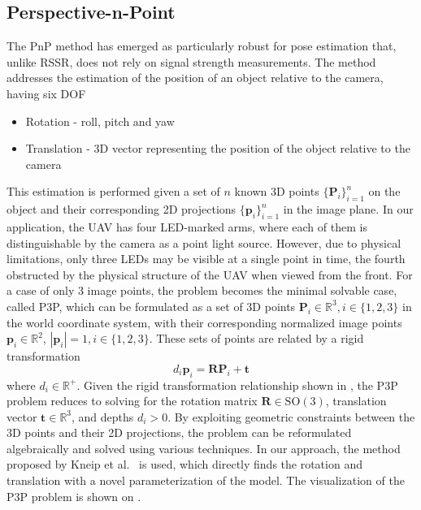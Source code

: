 \subsection{Perspective-n-Point}
The \ac{PnP} method has emerged as particularly robust for pose estimation that, unlike \ac{RSSR}, does not rely on signal strength measurements. The method addresses the estimation of the position of an object relative to the camera, having six \ac{DOF}
\begin{itemize}
\item{Rotation - roll, pitch and yaw}
\item{Translation - 3D vector representing the position of the object relative to the camera}
\end{itemize}
This estimation is performed given a set of $n$ known 3D points $\{\mathbf{P}_i\}_{i=1}^n$ on the object and their corresponding 2D projections $\{\mathbf{p}_i\}_{i=1}^n$ in the image plane.
In our application, the UAV has four \ac{LED}-marked arms, where each of them is distinguishable by the camera as a point light source.
However, due to physical limitations, only three \ac{LED}s may be visible at a single point in time, the fourth obstructed by the physical structure of the \ac{UAV} when viewed from the front.
For a case of only 3 image points, the problem becomes the minimal solvable case, called \ac{P3P}, which 
can be formulated as a set of 3D points $\textbf{P}_i \in \mathbb{R}^{3}, i \in \{1, 2, 3\}$ in the world coordinate system, with their corresponding normalized image points
$\textbf{p}_i \in \mathbb{R}^{2}$, $|\textbf{p}_i|=1, i \in \{1, 2, 3\}$. These sets of points are related by a rigid transformation~\cite{Ding_2023_CVPR}
\begin{equation}
d_i \textbf{p}_i = \textbf{R} \textbf{P}_i + \textbf{t}
\label{eq:p3p}
\end{equation}
where $d_i \in \mathbb{R}^+$.
Given the rigid transformation relationship shown in , the \ac{P3P} problem reduces to solving for the rotation matrix 
$\mathbf{R} \in \text{SO}(3)$, translation vector $\mathbf{t} \in \mathbb{R}^3$, and depths $d_i > 0$. 
By exploiting geometric constraints between the 3D points and their 2D projections, the problem can be
reformulated algebraically and solved using various techniques. In our approach, the method proposed by Kneip et al.~\cite{kneip} is used, which
directly finds the rotation and translation with a novel parameterization of the model.
The visualization of the \ac{P3P} problem is shown on .
